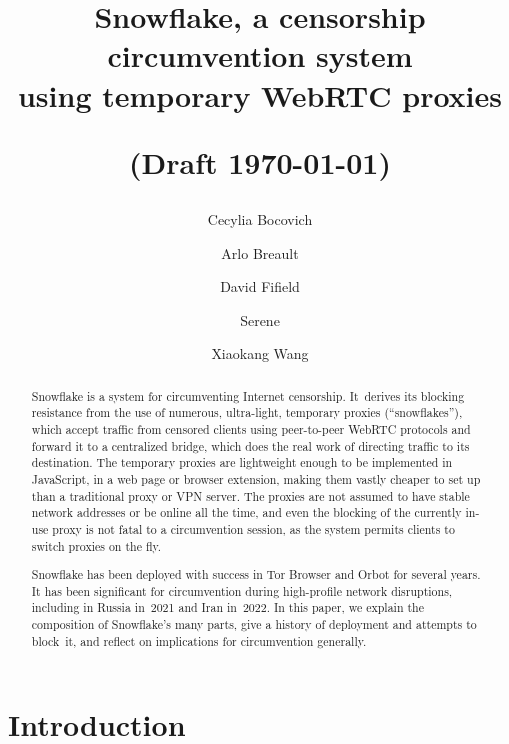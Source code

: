 \documentclass[letterpaper,twocolumn]{article}
\begin{document}
\date{}

\title{Snowflake, a censorship circumvention system \\using temporary WebRTC proxies \\\strut\large (Draft \today)}

\author{
Cecylia Bocovich \and
Arlo Breault \and
David Fifield \and
Serene \and
Xiaokang Wang
}
\renewcommand{\maketitlehookc}{\centering\normalsize Authors are listed alphabetically.}

\maketitle

\begin{abstract}
Snowflake is a system for circumventing Internet censorship.
It~derives its blocking resistance from
the use of numerous, ultra-light, temporary proxies (``snowflakes''),
which accept traffic from censored clients using peer-to-peer WebRTC protocols
and forward it to a centralized bridge,
which does the real work of directing traffic to its destination.
The temporary proxies are lightweight enough to be implemented in JavaScript,
in a web page or browser extension,
making them vastly cheaper to set up than
a traditional proxy or VPN server.
The proxies are not assumed to have stable network addresses
or be online all the time,
and even the blocking of the currently in-use proxy
is not fatal to a circumvention session,
as the system permits clients to switch proxies on the fly.


Snowflake has been deployed with success
in Tor Browser and Orbot for several years.
It has been significant for circumvention
during high-profile network disruptions,
including in Russia in~2021 and Iran in~2022.
In this paper, we explain the composition of Snowflake's many parts,
give a history of deployment and attempts to block~it,
and reflect on implications for circumvention generally.
\end{abstract}


\section{Introduction}
\label{sec:intro}
\end{document}
